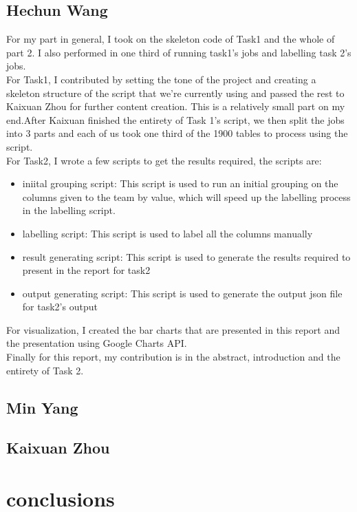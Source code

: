 \documentclass[sigconf]{acmart}
\begin{document}
\subsection{Hechun Wang}
For my part in general, I took on the skeleton code of Task1 and the whole of part 2. I also performed in one third of running task1's jobs and labelling task 2's jobs.\\
For Task1, I contributed by setting the tone of the project and creating a skeleton structure of the script that we're currently using and passed the rest to Kaixuan Zhou for further content creation. This is a relatively small part on my end.After Kaixuan finished the entirety of Task 1's script, we then split the jobs into 3 parts and each of us took one third of the 1900 tables to process using the script.\\
For Task2, I wrote a few scripts to get the results required, the scripts are:
\begin{itemize}
    \item {iniital grouping script}: This script is used to run an initial grouping on the columns given to the team by value, which will speed up the labelling process in the labelling script.
    \item {labelling script}: This script is used to label all the columns manually
    \item {result generating script}: This script is used to generate the results required to present in the report for task2
    \item {output generating script}: This script is used to generate the output json file for task2's output
\end{itemize}
For visualization, I created the bar charts that are presented in this report and the presentation using Google Charts API.\\
Finally for this report, my contribution is in the abstract, introduction and the entirety of Task 2. 
\subsection{Min Yang}
\subsection{Kaixuan Zhou}

\section{conclusions}
\end{document}
